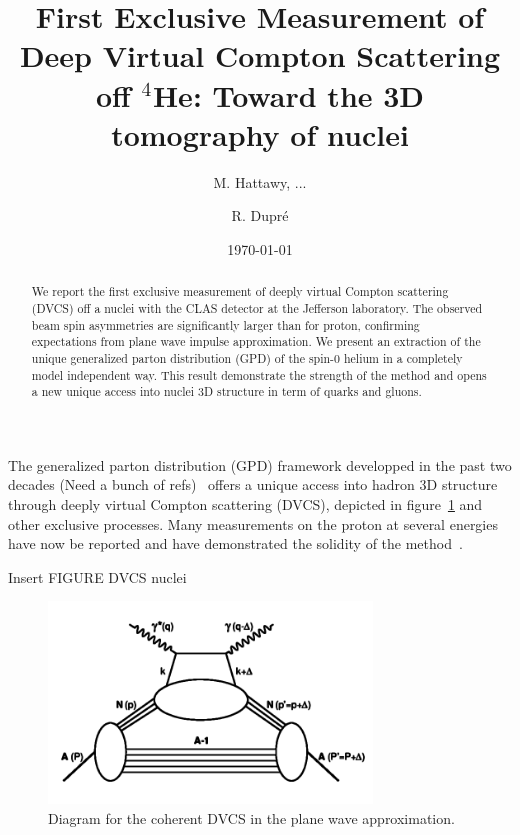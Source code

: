 \documentclass[%
 reprint,
 amsmath,amssymb,
 aps,
]{revtex4-1}
\begin{document}
\title{First Exclusive Measurement of Deep Virtual Compton Scattering off $^4$He: Toward the 3D tomography of nuclei}

\author{M. Hattawy, ...}
\author{R. Dupr\'e}

\date{\today}

\begin{abstract}
We report the first exclusive measurement of deeply virtual Compton scattering 
(DVCS) off a nuclei with the CLAS detector at the Jefferson laboratory. The 
observed beam spin asymmetries are significantly larger than for proton, 
confirming expectations from plane wave impulse approximation. We present an 
extraction of the unique generalized parton distribution (GPD) of the spin-0 
helium in a completely model independent way. This result demonstrate the 
strength of the method and opens a new unique access into nuclei 3D structure 
in term of quarks and gluons.
\end{abstract}


\maketitle


The generalized parton distribution (GPD) framework developped in the past two decades
(Need a bunch of refs)~\cite{}
offers a unique access into hadron 3D structure through deeply virtual Compton
scattering (DVCS), depicted in figure~\ref{fig:DVCS} and other exclusive processes. Many measurements on the proton
at several energies have now be reported and have demonstrated the solidity of the
method~\cite{}. %

Insert FIGURE DVCS nuclei
\begin{figure}[htbp]
\caption{\label{fig:DVCS} Diagram for the coherent DVCS in the plane wave approximation.}
\includegraphics[width=8.6cm]{DVCS.png}
\end{figure}
\end{document}
